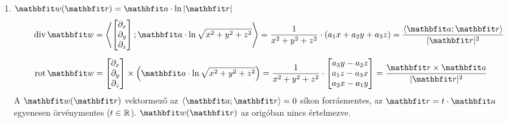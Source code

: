 \documentclass{szb-solution}
\begin{document}
\begin{enumerate}
  \item $\rvec w(\coordvec) = \rvec a \cdot \ln |\coordvec|$
        \begin{align*}
          \Div \rvec w
           & = \scalar{
            \begin{bmatrix}
              \partial_x \\ \partial_y \\ \partial_z
            \end{bmatrix}
          }{
            \rvec a \cdot \ln \sqrt{x^2 + y^2 + z^2}
          }
          = \frac{1}{x^2 + y^2 + z^2} \cdot \left(
          a_1 x + a_2 y + a_3 z
          \right) = \frac{\scalar{\rvec a}{\coordvec}}{|\coordvec|^2}
          \\[2mm]
          \rot \rvec w
           & =
          \begin{bmatrix}
            \partial_x \\ \partial_y \\ \partial_z
          \end{bmatrix}
          \times
          \left(
          \rvec a \cdot \ln \sqrt{x^2 + y^2 + z^2}
          \right)
          = \frac{1}{x^2 + y^2 + z^2} \cdot
          \begin{bmatrix}
            a_3 y - a_2 z \\
            a_1 z - a_3 x \\
            a_2 x - a_1 y
          \end{bmatrix}
          = \frac{\coordvec \times \rvec a}{|\coordvec|^2}
        \end{align*}
        A $\rvec w(\coordvec)$ vektormező az $\scalar{\rvec a}{\coordvec} = 0$
        síkon forrásmentes, az $\coordvec = t \cdot \rvec a$ egyenesen
        örvénymentes ($t \in \mathbb{R}$). $\rvec w(\coordvec)$ az origóban
        nincs értelmezve.
\end{enumerate}
\end{document}
